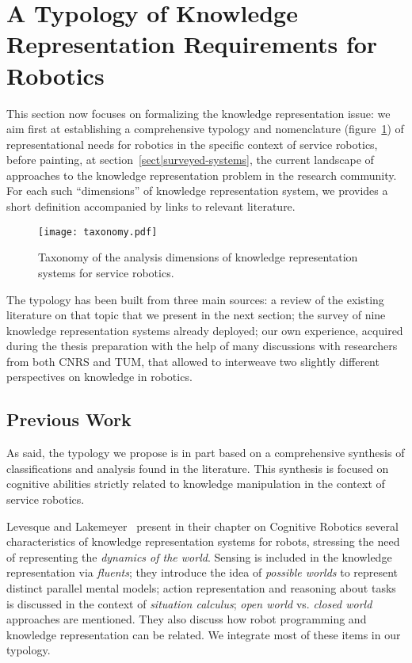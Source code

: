 \section{A Typology of Knowledge Representation Requirements for Robotics}
\label{sect|features}

This section now focuses on formalizing the knowledge representation issue: we
aim first at establishing a comprehensive typology and nomenclature
(figure~\ref{fig|taxo}) of representational needs for robotics in the specific
context of service robotics, before painting, at
section~\ref{sect|surveyed-systems}, the current landscape of approaches to the
knowledge representation problem in the research community. For each such
``dimensions'' of knowledge representation system, we provides a short
definition accompanied by links to relevant literature.

\begin{figure}
        \centering
        \texttt{[image: taxonomy.pdf]}
        \caption{Taxonomy of the analysis dimensions of knowledge
        representation systems for service robotics.}
        \label{fig|taxo}
\end{figure}

The typology has been built from three main sources: a review of the existing
literature on that topic that we present in the next section; the survey of
nine knowledge representation systems already deployed; our own experience,
acquired during the thesis preparation with the help of many discussions with
researchers from both CNRS and TUM, that allowed to interweave two slightly
different perspectives on knowledge in robotics.

\subsection{Previous Work}
\label{sect|evaluation-literature}

As said, the typology we propose is in part based on a comprehensive synthesis of
classifications and analysis found in the literature. This synthesis is focused
on cognitive abilities strictly related to knowledge manipulation in the
context of service robotics.

Levesque and Lakemeyer~\cite{Levesque2008} present in their chapter on
Cognitive Robotics several characteristics of knowledge representation systems
for robots, stressing the need of representing the \emph{dynamics of the
world}.  Sensing is included in the knowledge representation via
\emph{fluents}; they introduce the idea of \emph{possible worlds} to represent
distinct parallel mental models; action representation and reasoning about
tasks is discussed in the context of \emph{situation calculus}; \emph{open
world} vs. \emph{closed world} approaches are mentioned.  They also discuss how
robot programming and knowledge representation can be related. We integrate
most of these items in our typology.

